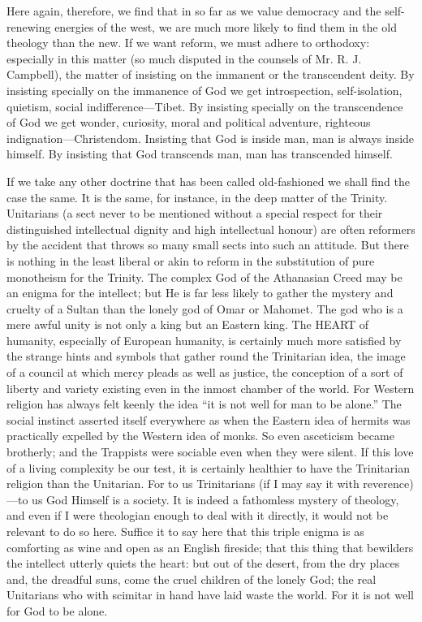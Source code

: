 Here again, therefore, we find that in so far as we value democracy and the self-renewing energies of the west, we are much more likely to find them in the old theology than the new. If we want reform, we must adhere to orthodoxy: especially in this matter (so much disputed in the counsels of Mr. R. J. Campbell), the matter of insisting on the immanent or the transcendent deity. By insisting specially on the immanence of God we get introspection, self-isolation, quietism, social indifference—Tibet. By insisting specially on the transcendence of God we get wonder, curiosity, moral and political adventure, righteous indignation—Christendom. Insisting that God is inside man, man is always inside himself. By insisting that God transcends man, man has transcended himself.

If we take any other doctrine that has been called old-fashioned we shall find the case the same. It is the same, for instance, in the deep matter of the Trinity. Unitarians (a sect never to be mentioned without a special respect for their distinguished intellectual dignity and high intellectual honour) are often reformers by the accident that throws so many small sects into such an attitude. But there is nothing in the least liberal or akin to reform in the substitution of pure monotheism for the Trinity. The complex God of the Athanasian Creed may be an enigma for the intellect; but He is far less likely to gather the mystery and cruelty of a Sultan than the lonely god of Omar or Mahomet. The god who is a mere awful unity is not only a king but an Eastern king. The HEART of humanity, especially of European humanity, is certainly much more satisfied by the strange hints and symbols that gather round the Trinitarian idea, the image of a council at which mercy pleads as well as justice, the conception of a sort of liberty and variety existing even in the inmost chamber of the world. For Western religion has always felt keenly the idea “it is not well for man to be alone.” The social instinct asserted itself everywhere as when the Eastern idea of hermits was practically expelled by the Western idea of monks. So even asceticism became brotherly; and the Trappists were sociable even when they were silent. If this love of a living complexity be our test, it is certainly healthier to have the Trinitarian religion than the Unitarian. For to us Trinitarians (if I may say it with reverence)—to us God Himself is a society. It is indeed a fathomless mystery of theology, and even if I were theologian enough to deal with it directly, it would not be relevant to do so here. Suffice it to say here that this triple enigma is as comforting as wine and open as an English fireside; that this thing that bewilders the intellect utterly quiets the heart: but out of the desert, from the dry places and, the dreadful suns, come the cruel children of the lonely God; the real Unitarians who with scimitar in hand have laid waste the world. For it is not well for God to be alone.

